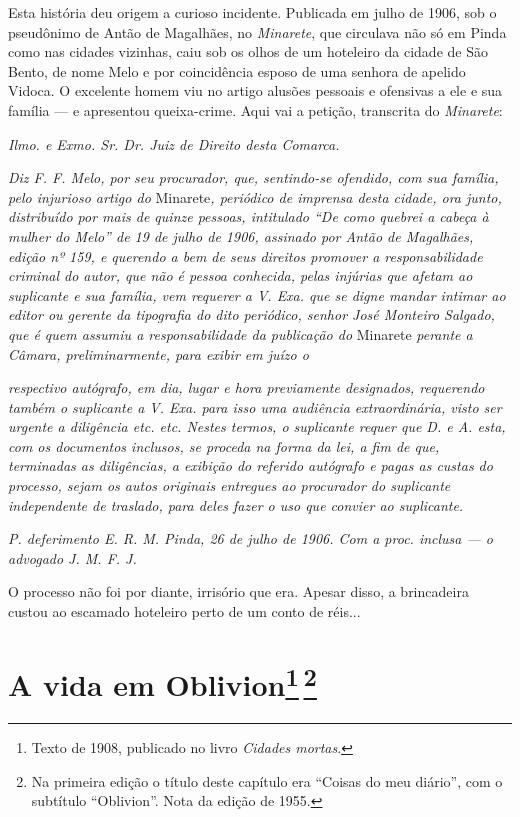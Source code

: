 Esta história deu origem a curioso incidente. Publicada em julho de
1906, sob o pseudônimo de Antão de Magalhães, no \emph{Minarete}, que
circulava não só em Pinda como nas cidades vizinhas, caiu sob os olhos
de um hoteleiro da cidade de São Bento, de nome Melo e por coincidência
esposo de uma senhora de apelido Vidoca. O excelente homem viu no artigo
alusões pessoais e ofensivas a ele e sua família --- e apresentou
queixa-crime. Aqui vai a petição, transcrita do \emph{Minarete}:

\emph{Ilmo. e Exmo. Sr. Dr. Juiz de Direito desta Comarca.}

\emph{Diz F. F. Melo, por seu procurador, que, sentindo-se ofendido, com
sua família, pelo injurioso artigo do} Minarete\emph{, periódico de
imprensa desta cidade, ora junto, distribuído por mais de quinze
pessoas, intitulado ``De como quebrei a cabeça à mulher do Melo'' de 19
de julho de 1906, assinado por Antão de Magalhães, edição nº 159, e
querendo a bem de seus direitos promover a responsabilidade criminal do
autor, que não é pessoa conhecida, pelas injúrias que afetam ao
suplicante e sua família, vem requerer a V. Exa. que se digne mandar
intimar ao editor ou gerente da tipografia do dito periódico, senhor
José Monteiro Salgado, que é quem assumiu a responsabilidade da
publicação do} Minarete \emph{perante a Câmara, preliminarmente, para
exibir em juízo o}

\emph{respectivo autógrafo, em dia, lugar e hora previamente designados,
requerendo também o suplicante a V. Exa. para isso uma audiência
extraordinária, visto ser urgente a diligência etc. etc. Nestes termos,
o suplicante requer que D. e A. esta, com os documentos inclusos, se
proceda na forma da lei, a fim de que, terminadas as diligências, a
exibição do referido autógrafo e pagas as custas do processo, sejam os
autos originais entregues ao procurador do suplicante independente de
traslado, para deles fazer o uso que convier ao suplicante.}

\emph{P. deferimento E. R. M. Pinda, 26 de julho de 1906. Com a proc.
inclusa --- o advogado J. M. F. J.}

O processo não foi por diante, irrisório que era. Apesar disso, a
brincadeira custou ao escamado hoteleiro perto de um conto de réis...

\chapter{A vida em Oblivion\footnote[*]{Texto de 1908, publicado no livro \emph{Cidades mortas}.}\,\footnote[**]{Na primeira edição o
  título deste capítulo era ``Coisas do meu diário'', com o subtítulo
  ``Oblivion''. Nota da edição de 1955.}}

